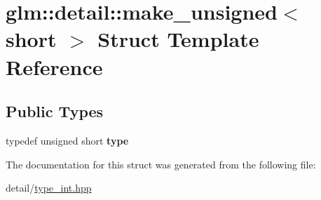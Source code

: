 \hypertarget{structglm_1_1detail_1_1make__unsigned_3_01short_01_4}{\section{glm\-:\-:detail\-:\-:make\-\_\-unsigned$<$ short $>$ Struct Template Reference}
\label{structglm_1_1detail_1_1make__unsigned_3_01short_01_4}
}
\subsection*{Public Types}
\begin{DoxyCompactItemize}
\item 
\hypertarget{structglm_1_1detail_1_1make__unsigned_3_01short_01_4_a58861091aca3a68acc085131cc6fefa4}{typedef unsigned short {\bfseries type}}\label{structglm_1_1detail_1_1make__unsigned_3_01short_01_4_a58861091aca3a68acc085131cc6fefa4}

\end{DoxyCompactItemize}


The documentation for this struct was generated from the following file\-:\begin{DoxyCompactItemize}
\item 
detail/\hyperlink{type__int_8hpp}{type\-\_\-int.\-hpp}\end{DoxyCompactItemize}

